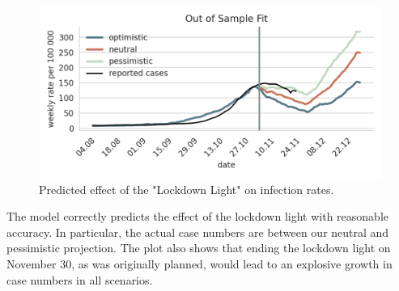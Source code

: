 \begin{figure}[!tp]
    \centering
    \includegraphics[width=\textwidth]{../figures/out_of_sample_validation}
    \caption{Predicted effect of the "Lockdown Light" on infection rates.}
    \label{fig:out-of-sample-fit}
\end{figure}

The model correctly predicts the effect of the lockdown light with reasonable accuracy.
In particular, the actual case numbers are between our neutral and pessimistic
projection. The plot also shows that ending the lockdown light on November 30, as was
originally planned, would lead to an explosive growth in case numbers in all scenarios.
